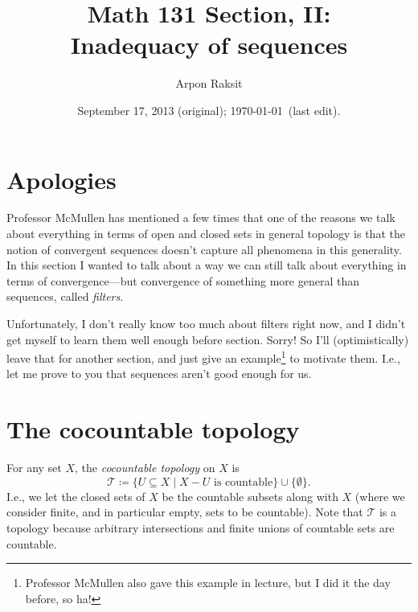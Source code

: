 


\title{Math 131 Section, II:\\Inadequacy of sequences}
\author{Arpon Raksit}
\date{September 17, 2013 (original); \today\ (last edit).}


\maketitle
\thispagestyle{fancy}


\section{Apologies}

Professor McMullen has mentioned a few times that one of the reasons
we talk about everything in terms of open and closed sets in general
topology is that the notion of convergent sequences doesn't capture
all phenomena in this generality. In this section I wanted to talk
about a way we can still talk about everything in terms of
convergence---but convergence of something more general than
sequences, called \textit{filters}.

Unfortunately, I don't really know too much about filters right now,
and I didn't get myself to learn them well enough before
section. Sorry! So I'll (optimistically) leave that for another
section, and just give an example\footnote{Professor McMullen also
  gave this example in lecture, but I did it the day before, so ha!}
to motivate them. I.e., let me prove to you that sequences aren't good
enough for us.

\renewcommand{\T}{\mathcal{T}}

\section{The cocountable topology}

\begin{definition}
  For any set $X$, the \textit{cocountable topology} on $X$ is
\[
\T \coloneqq \{U \subseteq X \mid X - U \text{ is countable}\} \cup
\{\emptyset\}.
\]
I.e., we let the closed sets of $X$ be the countable subsets along
with $X$ (where we consider finite, and in particular empty, sets to
be countable). Note that $\T$ is a topology because arbitrary
intersections and finite unions of countable sets are countable.
\end{definition}

